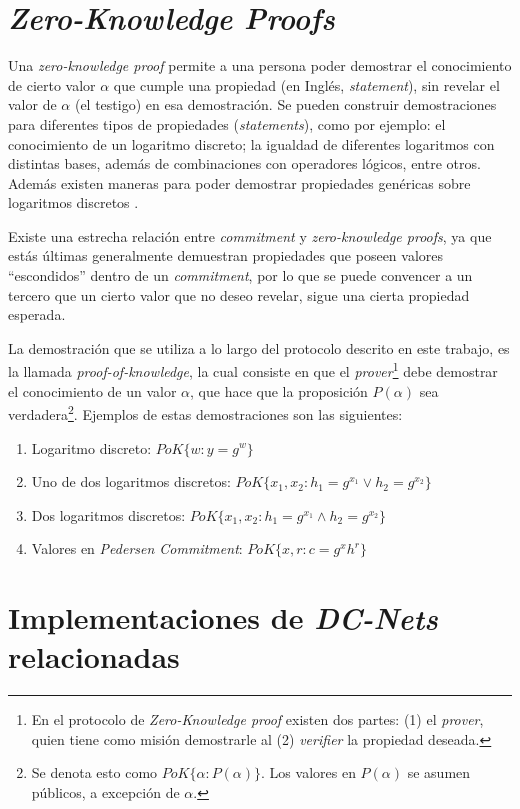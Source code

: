 \section{\emph{Zero-Knowledge Proofs}}

Una \emph{zero-knowledge proof} permite a una persona poder demostrar el conocimiento de cierto valor $\alpha$ que cumple una propiedad 
  (en Inglés, \emph{statement}), sin revelar el valor de $\alpha$ (el testigo) en esa demostración.
Se pueden construir demostraciones para diferentes tipos de propiedades (\emph{statements}), como por ejemplo: el conocimiento de 
un logaritmo discreto; la igualdad de diferentes logaritmos con distintas bases, además de combinaciones con operadores 
lógicos, entre otros. Además existen maneras para poder demostrar propiedades genéricas sobre logaritmos discretos \cite{camenisch1997proof}.
  
Existe una estrecha relación entre \emph{commitment} y \emph{zero-knowledge proofs}, ya que estás últimas generalmente demuestran 
propiedades que poseen valores ``escondidos'' dentro de un \emph{commitment}, por lo que se puede convencer a un tercero que un cierto 
valor que no deseo revelar, sigue una cierta propiedad esperada.

La demostración que se utiliza a lo largo del protocolo descrito en este trabajo, es la llamada \emph{proof-of-knowledge}, la cual 
consiste en que el \emph{prover}\footnote{En el protocolo de \emph{Zero-Knowledge proof} existen dos partes: (1) el 
\emph{prover}, quien tiene 
como misión demostrarle al (2) \emph{verifier} la propiedad deseada.}  debe demostrar el conocimiento de un valor $\alpha$, 
que hace que la proposición $P(\alpha)$ sea verdadera\footnote{Se denota esto como $PoK\{\alpha : P(\alpha)\}$. 
Los valores en $P(\alpha)$ se asumen públicos, a excepción de $\alpha$.}. 
Ejemplos de estas demostraciones son las siguientes:
\begin{enumerate}
  \item Logaritmo discreto: $PoK\{w : y = g^w\}$
  \item Uno de dos logaritmos discretos: $PoK\{x_1, x_2 : h_1 = g^{x_1} \lor h_2 = g^{x_2}\}$
  \item Dos logaritmos discretos: $PoK\{x_1, x_2 : h_1 = g^{x_1} \land h_2 = g^{x_2}\}$
  \item Valores en \emph{Pedersen Commitment}: $PoK\{x, r : c = g^x h^r\}$
\end{enumerate}

\section{Implementaciones de \emph{DC-Nets} relacionadas}

